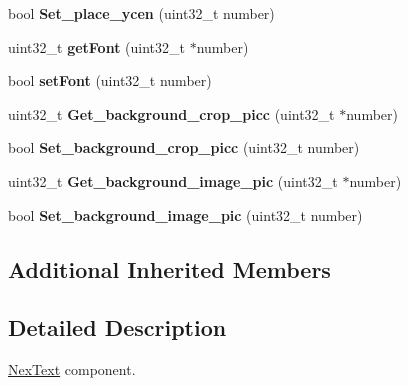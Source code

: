 \begin{DoxyCompactItemize}
\item 
\hypertarget{class_nex_text_a0f8ad9780c8145569da6736d0ee494e4}{bool {\bfseries Set\+\_\+place\+\_\+ycen} (uint32\+\_\+t number)}\label{class_nex_text_a0f8ad9780c8145569da6736d0ee494e4}

\item 
\hypertarget{class_nex_text_adc480199a2b396811aa0c14928b592c8}{uint32\+\_\+t {\bfseries get\+Font} (uint32\+\_\+t $\ast$number)}\label{class_nex_text_adc480199a2b396811aa0c14928b592c8}

\item 
\hypertarget{class_nex_text_a5dd7fdda945a76033ef8fe8dc68e3e52}{bool {\bfseries set\+Font} (uint32\+\_\+t number)}\label{class_nex_text_a5dd7fdda945a76033ef8fe8dc68e3e52}

\item 
\hypertarget{class_nex_text_ae44393fb20ba449bf088dbd0758b4219}{uint32\+\_\+t {\bfseries Get\+\_\+background\+\_\+crop\+\_\+picc} (uint32\+\_\+t $\ast$number)}\label{class_nex_text_ae44393fb20ba449bf088dbd0758b4219}

\item 
\hypertarget{class_nex_text_a3727463a4fc0e1df978cd8fc7d1103ed}{bool {\bfseries Set\+\_\+background\+\_\+crop\+\_\+picc} (uint32\+\_\+t number)}\label{class_nex_text_a3727463a4fc0e1df978cd8fc7d1103ed}

\item 
\hypertarget{class_nex_text_aed07b3988fe2c4ec332727bb245e49a5}{uint32\+\_\+t {\bfseries Get\+\_\+background\+\_\+image\+\_\+pic} (uint32\+\_\+t $\ast$number)}\label{class_nex_text_aed07b3988fe2c4ec332727bb245e49a5}

\item 
\hypertarget{class_nex_text_ab2c85ac7d5184e124b0cd724028c1915}{bool {\bfseries Set\+\_\+background\+\_\+image\+\_\+pic} (uint32\+\_\+t number)}\label{class_nex_text_ab2c85ac7d5184e124b0cd724028c1915}

\end{DoxyCompactItemize}
\subsection*{Additional Inherited Members}


\subsection{Detailed Description}
\hyperlink{class_nex_text}{Nex\+Text} component. 

